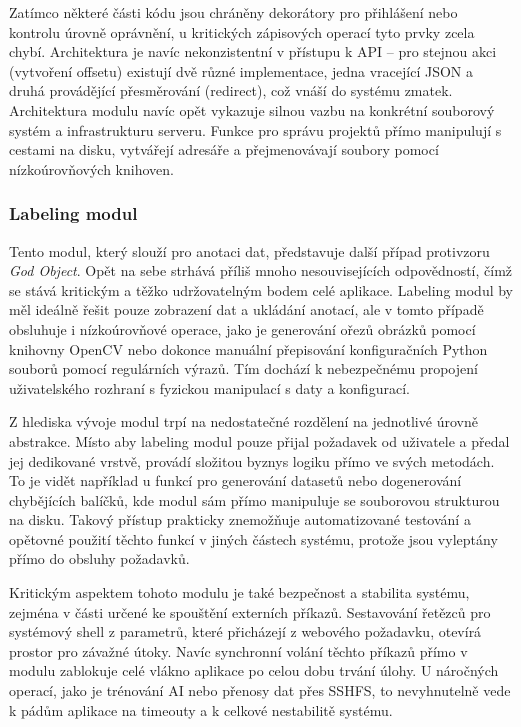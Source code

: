 \documentclass[FM,DP,fonts]{tulthesis}
\begin{document}
Zatímco některé části kódu jsou chráněny dekorátory pro přihlášení nebo kontrolu úrovně oprávnění, u kritických zápisových operací tyto prvky zcela chybí. Architektura je navíc nekonzistentní v přístupu k API – pro stejnou akci (vytvoření offsetu) existují dvě různé implementace, jedna vracející JSON a druhá provádějící přesměrování (redirect), což vnáší do systému zmatek. Architektura modulu navíc opět vykazuje silnou vazbu na konkrétní souborový systém a infrastrukturu serveru. Funkce pro správu projektů přímo manipulují s cestami na disku, vytvářejí adresáře a přejmenovávají soubory pomocí nízkoúrovňových knihoven.

\subsubsection{Labeling modul}
Tento modul, který slouží pro anotaci dat, představuje další případ protivzoru \textit{God Object}. Opět na sebe strhává příliš mnoho nesouvisejících odpovědností, čímž se stává kritickým a těžko udržovatelným bodem celé aplikace. Labeling modul by měl ideálně řešit pouze zobrazení dat a ukládání anotací, ale v tomto případě obsluhuje i nízkoúrovňové operace, jako je generování ořezů obrázků pomocí knihovny OpenCV nebo dokonce manuální přepisování konfiguračních Python souborů pomocí regulárních výrazů. Tím dochází k nebezpečnému propojení uživatelského rozhraní s fyzickou manipulací s daty a konfigurací.

Z hlediska vývoje modul trpí na nedostatečné rozdělení na jednotlivé úrovně abstrakce. Místo aby labeling modul pouze přijal požadavek od uživatele a předal jej dedikované vrstvě, provádí složitou byznys logiku přímo ve svých metodách. To je vidět například u funkcí pro generování datasetů nebo dogenerování chybějících balíčků, kde modul sám přímo manipuluje se souborovou strukturou na disku. Takový přístup prakticky znemožňuje automatizované testování a opětovné použití těchto funkcí v jiných částech systému, protože jsou vyleptány přímo do obsluhy požadavků.

Kritickým aspektem tohoto modulu je také bezpečnost a stabilita systému, zejména v části určené ke spouštění externích příkazů. Sestavování řetězců pro systémový shell z parametrů, které přicházejí z webového požadavku, otevírá prostor pro závažné útoky. Navíc synchronní volání těchto příkazů přímo v modulu zablokuje celé vlákno aplikace po celou dobu trvání úlohy. U náročných operací, jako je trénování AI nebo přenosy dat přes SSHFS, to nevyhnutelně vede k pádům aplikace na timeouty a k celkové nestabilitě systému.
\end{document}
